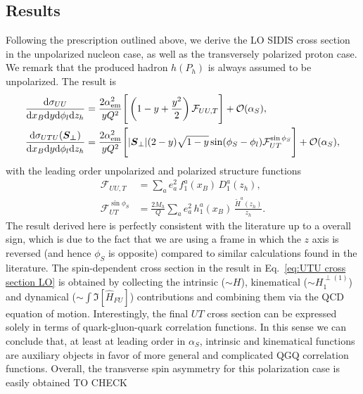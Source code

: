 \subsection{Results}
Following the prescription outlined above, we derive the LO SIDIS cross section in the unpolarized nucleon case, as well as the transversely polarized proton case. We remark that the produced hadron $h(P_h)$ is always assumed to be unpolarized. The result is
\begin{equation}\label{eq:UTU cross section LO}
    \begin{aligned}
        \frac{\dd \sigma_{UU}}{\dd x_B \dd y \dd \phi_l \dd z_h}&=  \frac{2 \alpha_{\rm em}^2}{y  Q^2}  \Bigg[\left(1-y+\frac{y^2}{2}\right)\mathcal{F}_{UU,T}\Bigg]+\mathcal{O}(\alpha_S),\\
        \frac{\dd \sigma_{UTU}(\boldsymbol{S_\perp})}{\dd x_B \dd y \dd \phi_l \dd z_h}&=\frac{2 \alpha_{\rm em}^2}{y  Q^2}\Bigg[ |\boldsymbol{S}_\perp|(2-y)\sqrt{1-y}\sin(\phi_S-\phi_l)\mathcal{F}_{UT}^{\sin\phi_S}\Bigg]+\mathcal{O}(\alpha_S),
    \end{aligned}
\end{equation}
with the leading order unpolarized and polarized structure functions
\begin{equation}
    \begin{aligned}
        \mathcal{F}_{UU,T}&= \sum_a e_a^2\, f_1^a(x_B)\, D_1^a(z_h),\\
        \mathcal{F}_{UT}^{\sin\phi_S}&=\frac{2 M_h}{Q}\sum_a e_a^2 \,h_1^a(x_B)\, \frac{\tilde{H}^a(z_h)}{z_h}.
    \end{aligned}
\end{equation}
The result derived here is perfectly consistent with the literature \cite{mulders_complete_1996, bacchetta_semi-inclusive_2007} up to a overall sign, which is due to the fact that we are using a frame in which the $z$ axis is reversed (and hence $\phi_S$ is opposite) compared to similar calculations found in the literature. The spin-dependent cross section in the result in Eq.~\ref{eq:UTU cross section LO} is obtained by collecting the intrinsic ($\sim H$), kinematical ($\sim H_1^{\perp(1)}$) and dynamical ($\sim \int\Im[\hat H_{FU}]$) contributions and combining them via the QCD equation of motion. Interestingly, the final $UT$ cross section can be expressed solely in terms of quark-gluon-quark correlation functions. In this sense we can conclude that, at least at leading order in $\alpha_S$, intrinsic and kinematical functions are auxiliary objects in favor of more general and complicated QGQ correlation functions. Overall, the transverse spin asymmetry for this polarization case is easily obtained TO CHECK

